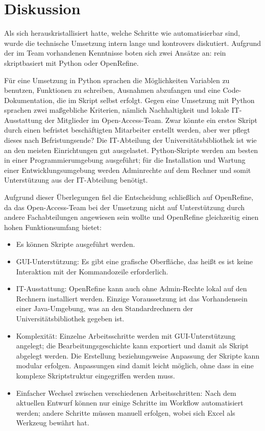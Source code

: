 \documentclass[a4paper,
fontsize=11pt,
oneside,
numbers=noperiodatend,
parskip=half-,
bibliography=totoc,
final
]{scrartcl}
\begin{document}
\hypertarget{diskussion}{%
\section*{Diskussion}\label{diskussion}}

Als sich herauskristallisiert hatte, welche Schritte wie automatisierbar
sind, wurde die technische Umsetzung intern lange und kontrovers
diskutiert. Aufgrund der im Team vorhandenen Kenntnisse boten sich zwei
Ansätze an: rein skriptbasiert mit Python oder OpenRefine.

Für eine Umsetzung in Python sprachen die Möglichkeiten Variablen zu
benutzen, Funktionen zu schreiben, Ausnahmen abzufangen und eine
Code-Dokumentation, die im Skript selbst erfolgt. Gegen eine Umsetzung
mit Python sprachen zwei maßgebliche Kriterien, nämlich Nachhaltigkeit
und lokale IT-Ausstattung der Mitglieder im Open-Access-Team. Zwar
könnte ein erstes Skript durch einen befristet beschäftigten Mitarbeiter
erstellt werden, aber wer pflegt dieses nach Befristungsende? Die
IT-Abteilung der Universitätsbibliothek ist wie an den meisten
Einrichtungen gut ausgelastet. Python-Skripte werden am besten in einer
Programmierumgebung ausgeführt; für die Installation und Wartung einer
Entwicklungsumgebung werden Adminrechte auf dem Rechner und somit
Unterstützung aus der IT-Abteilung benötigt.

Aufgrund dieser Überlegungen fiel die Entscheidung schließlich auf
OpenRefine, da das Open-Access-Team bei der Umsetzung nicht auf
Unterstützung durch andere Fachabteilungen angewiesen sein wollte und
OpenRefine gleichzeitig einen hohen Funktionsumfang bietet:

\begin{itemize}
\item
  Es können Skripte ausgeführt werden.
\item
  GUI-Unterstützung: Es gibt eine grafische Oberfläche, das heißt es ist
  keine Interaktion mit der Kommandozeile erforderlich.
\item
  IT-Ausstattung: OpenRefine kann auch ohne Admin-Rechte lokal auf den
  Rechnern installiert werden. Einzige Voraussetzung ist das
  Vorhandensein einer Java-Umgebung, was an den Standardrechnern der
  Universitätsbibliothek gegeben ist.
\item
  Komplexität: Einzelne Arbeitsschritte werden mit GUI-Unterstützung
  angelegt; die Bearbeitungsgeschichte kann exportiert und damit als
  Skript abgelegt werden. Die Erstellung beziehungsweise Anpassung der
  Skripte kann modular erfolgen. Anpassungen sind damit leicht möglich,
  ohne dass in eine komplexe Skriptstruktur eingegriffen werden muss.
\item
  Einfacher Wechsel zwischen verschiedenen Arbeitsschritten: Nach dem
  aktuellen Entwurf können nur einige Schritte im Workflow automatisiert
  werden; andere Schritte müssen manuell erfolgen, wobei sich Excel als
  Werkzeug bewährt hat.
\end{itemize}
\end{document}
